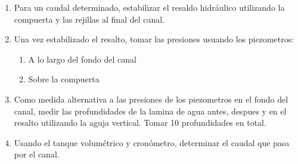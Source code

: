 \documentclass[10pt, a4paper]{exam}
\begin{document}
\begin{enumerate}
\item Para un caudal determinado, estabilizar el resaldo hidr\'aulico utilizando la compuerta y las rejillas al final del canal.
\item Una vez estabilizado el resalto, tomar las presiones usuando los piezometros:
\begin{enumerate}
\item A lo largo del fondo del canal
\item Sobre la compuerta
\end{enumerate}
\item Como medida alternativa a las presiones de los piezometros en el fondo del canal, medir las profundidades de la lamina de agua antes, despues y en el resalto utilizando la aguja vertical. Tomar 10 profundidades en total.  
\item Usando el tanque volum\'etrico y cron\'ometro, determinar el caudal que pasa por el canal. 
\end{enumerate}
\end{document}

